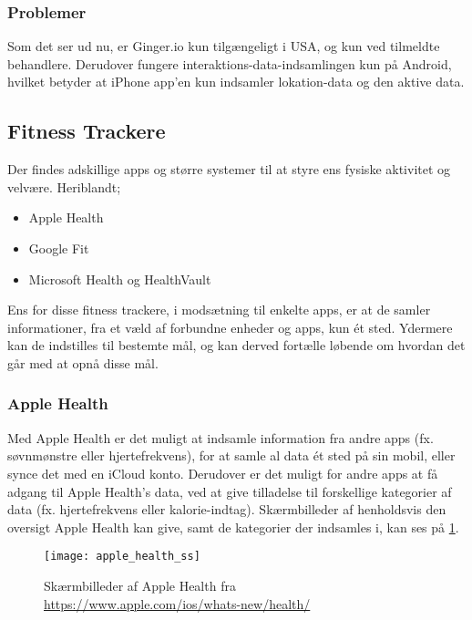 \subsubsection*{Problemer}
Som det ser ud nu, er Ginger.io kun tilgængeligt i USA, og kun ved tilmeldte behandlere.
Derudover fungere interaktions-data-indsamlingen kun på Android, hvilket betyder at iPhone app'en kun indsamler lokation-data og den aktive data.

\subsection{Fitness Trackere}
Der findes adskillige apps og større systemer til at styre ens fysiske aktivitet og velvære.
Heriblandt;
\begin{itemize}
\item Apple Health\cite{apple_health}
\item Google Fit\cite{google_fit}\cite{google_fit_api}
\item Microsoft Health\cite{ms_health} og HealthVault\cite{ms_health_vault}\cite{ms_health_vault_api}
\end{itemize}

Ens for disse fitness trackere, i modsætning til enkelte apps, er at de samler informationer, fra et væld af forbundne enheder og apps, kun ét sted.
Ydermere kan de indstilles til bestemte mål, og kan derved fortælle løbende om hvordan det går med at opnå disse mål.

\subsubsection{Apple Health}
Med Apple Health er det muligt at indsamle information fra andre apps (fx. søvnmønstre eller hjertefrekvens), for at samle al data ét sted på sin mobil, eller synce det med en iCloud konto.
Derudover er det muligt for andre apps at få adgang til Apple Health's data, ved at give tilladelse til forskellige kategorier af data (fx. hjertefrekvens eller kalorie-indtag).
Skærmbilleder af henholdsvis den oversigt Apple Health kan give, samt de kategorier der indsamles i, kan ses på \cref{eksisterende_systemer:apple_health_ss}.

\begin{figure}
\centering
\texttt{[image: apple\_health\_ss]}
\caption{Skærmbilleder af Apple Health fra \url{https://www.apple.com/ios/whats-new/health/}}
\label{eksisterende_systemer:apple_health_ss}
\end{figure}

